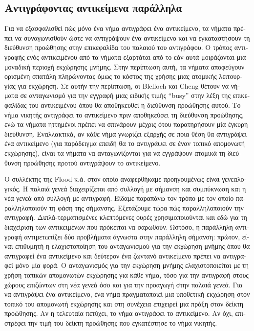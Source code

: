 \begin{greek}
\subsection{Αντιγράφοντας αντικείμενα παράλληλα}
Για να εξασφαλισθεί πώς μόνο ένα νήμα αντιγράφει ένα αντικείμενο,
τα νήματα πρέπει να συναγωνισθούν ώστε να αντιγράψουν ένα αντικείμενο
και να εγκαταστήσουν τη διεύθυνση προώθησης στην επικεφαλίδα
του παλαιού του αντιγράφου. Ο τρόπος αντιγραφής ενός αντικειμένου
από τα νήματα εξαρτάται από το εάν αυτά μοιράζονται μια μοναδική
περιοχή εκχώρησης μνήμης. Στην περίπτωση αυτή, τα νήματα αποφεύγουν
ορισμένη σπατάλη πληρώνοντας όμως το κόστος της χρήσης μιας
ατομικής λειτουργίας για εκχώρηση. Σε αυτήν την περίπτωση, οι
Blelloch και Cheng \cite{DBLP:conf/pldi/BlellochC99} θέτουν
να νήματα σε ανταγωνισμό για την εγγραφή μιας ειδικής τιμής
``busy'' στην λέξη της επικεφαλίδας του αντικειμένου όπου θα
αποθηκευθεί η διεύθυνση προώθησης αυτού. Το νήμα νικητής αντιγράφει
το αντικείμενο πριν αποθηκεύσει τη διεύθυνση προώθησης, ενώ
τα νήματα ηττημένοι πρέπει να σπινάρουν μέχρις ότου παρατηρήσουν
μία έγκυρη διεύθυνση. Εναλλακτικά, αν κάθε νήμα γνωρίζει εξαρχής
σε ποια θέση θα αντιγράψει ένα αντικείμενο (για παράδειγμα
επειδή θα το αντιγράψει σε έναν τοπικό απομονωτή εκχώρησης),
είναι τα νήματα να ανταγωνίζονται για να εγγράψουν ατομικά
τη διεύθυνση προώθησης προτού αντιγράψουν το αντικείμενο.

Ο συλλέκτης της Flood κ.ά. \cite{DBLP:conf/jvm/FloodDSZ01} στον
οποίο αναφερθήκαμε προηγουμένως είναι γενεαλογικός. Η παλαιά
γενεά διαχειρίζεται από συλλογή με σήμανση και συμπύκνωση και
η νέα γενεά από συλλογή με αντιγραφή. Είδαμε παραπάνω τον
τρόπο με τον οποίο παραλληλοποιούν τη φάση της σήμανσης.
Εξετάζουμε τώρα πώς παραλληλοποιούν την αντιγραφή. Διπλά-τερματισμένες
κλεπτόμενες ουρές χρησιμοποιούνται και εδώ για τη διαχείριση
των αντικειμένων που πρόκειται να σαρωθούν. Ωστόσο, η παράλληλη αντιγραφή αντιμετωπίζει δύο
προβλήματα άγνωστα στην παράλληλη σήμανση: πρώτον, είναι επιθυμητή
η ελαχιστοποίηση του ανταγωνισμού για την εκχώρηση μνήμης όπου
θα αντιγραφεί ένα αντικείμενο και δεύτερον ένα ζωντανό αντικείμενο
πρέπει να αντιγραφεί μόνο μία φορά. Ο ανταγωνισμός για την
εκχώρηση μνήμης ελαχιστοποιείται με τη χρήση τοπικών απομονωτών
εκχώρησης για κάθε νήμα, τόσο για την αντιγραφή στους χώρους
επιζώντων στη νέα γενεά όσο και για την προαγωγή στην παλαιά
γενεά. Για να αντιγράψει ένα αντικείμενο, ένα νήμα πραγματοποιεί
μια υποθετική εκχώρηση στον τοπικό του απομονωτή εκχώρησης
και στη συνέχεια επιχειρεί μια πράξη 
στον δείκτη προώθησης. Αν η τελευταία πετύχει, το νήμα αντιγράφει
το αντικείμενο. Αν όχι, επιστρέφει την τιμή του δείκτη προώθησης
που εγκατέστησε το νήμα νικητής.


\end{greek}
